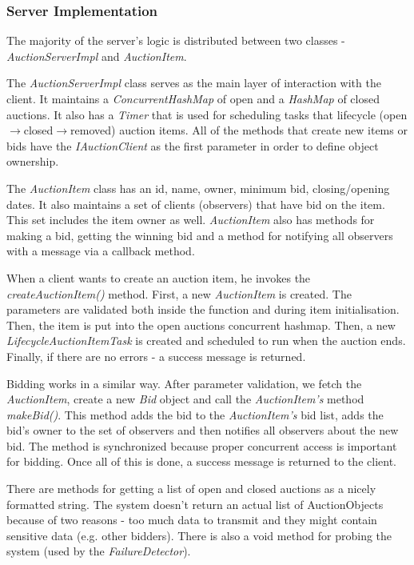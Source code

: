 \documentclass[10pt]{article}
\begin{document}
\subsubsection{Server Implementation}
The majority of the server's logic is distributed between two classes - \textit{AuctionServerImpl} and \textit{AuctionItem}.\par
The \textit{AuctionServerImpl} class serves as the main layer of interaction with the client. It maintains a \textit{ConcurrentHashMap} of open and a \textit{HashMap} of closed auctions. It also has a \textit{Timer} that is used for scheduling tasks that lifecycle (open$\rightarrow$closed$\rightarrow$removed) auction items. All of the methods that create new items or bids have the \textit{IAuctionClient} as the first parameter in order to define object ownership.\par
The \textit{AuctionItem} class has an id, name, owner, minimum bid, closing/opening dates. It also maintains a set of clients (observers) that have bid on the item. This set includes the item owner as well. \textit{AuctionItem} also has methods for making a bid, getting the winning bid and a method for notifying all observers with a message via a callback method.\par 
When a client wants to create an auction item, he invokes the \textit{createAuctionItem()} method. First, a new \textit{AuctionItem} is created. The parameters are validated both inside the function and during item initialisation. Then, the item is put into the open auctions concurrent hashmap. Then, a new \textit{LifecycleAuctionItemTask} is created and scheduled to run when the auction ends. Finally, if there are no errors - a success message is returned.\par
Bidding works in a similar way. After parameter validation, we fetch the \textit{AuctionItem}, create a new \textit{Bid} object and call the \textit{AuctionItem's} method \textit{makeBid()}. This method adds the bid to the \textit{AuctionItem's} bid list, adds the bid's owner to the set of observers and then notifies all observers about the new bid. The method is synchronized because proper concurrent access is important for bidding. Once all of this is done, a success message is returned to the client.\par
There are methods for getting a list of open and closed auctions as a nicely formatted string. The system doesn't return an actual list of AuctionObjects because of two reasons - too much data to transmit and they might contain sensitive data (e.g. other bidders). There is also a void method for probing the system (used by the \textit{FailureDetector}).
\end{document}
